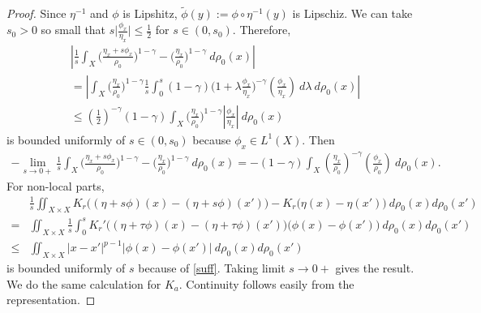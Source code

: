 \documentclass[10pt, letterpaper]{article}
\def\dr{{d\rho_0(x)}}
\theoremstyle{definition}
\theoremstyle{remark}
\begin{document}
\begin{proof}
Since $\eta^{-1}$ and $\phi$ is Lipshitz, $\tilde \phi(y) := \phi\circ \eta^{-1}(y)$ is Lipschiz. We can take $s_0>0$ so small that $s\Big|\frac{\phi_x}{\eta_x}\Big| \le \frac{1}{2}$ for $s\in(0,s_0)$.
Therefore,
\begin{align*}
 &\left|\frac{1}{s}\int_X \Big(\frac{\eta_x + s\phi_x}{\rho_0}\Big)^{1-\gamma} -\Big(\frac{\eta_x}{\rho_0}\Big)^{1-\gamma} \: \dr\right|\\
 &= \left|\int_X \Big(\frac{\eta_x}{\rho_0}\Big)^{1-\gamma} \frac{1}{s}\int_0^s(1-\gamma)\Big(1 + \lambda\frac{\phi_x}{\eta_x}\Big)^{-\gamma}\left(\frac{\phi_x}{\eta_x}\right)\:d\lambda \: \dr\right|\\
 &\le \left(\frac{1}{2}\right)^{-\gamma}(1-\gamma)\int_X \Big(\frac{\eta_x}{\rho_0}\Big)^{1-\gamma} \left|\frac{\phi_x}{\eta_x}\right| \: \dr
\end{align*}
is bounded uniformly of $s\in(0,s_0)$ because $\phi_x \in L^1(X)$. Then
 \begin{align*}
  -\lim_{s \rightarrow 0+} \frac{1}{s} \int_X \Big(\frac{\eta_x + s\phi_x}{\rho_0}\Big)^{1-\gamma} -\Big(\frac{\eta_x}{\rho_0}\Big)^{1-\gamma} \: \dr  = -(1-\gamma)\int_X \left(\frac{\eta_x}{\rho_0}\right)^{-\gamma}\left(\frac{\phi_x}{\rho_0}\right) \: \dr.
 \end{align*}
For non-local parts, 
\begin{align*}
  &\frac{1}{s}\iint_{X\times X} K_r\Big( (\eta + s\phi)(x) - (\eta + s\phi)(x')\Big)- K_r\Big(\eta(x) - \eta(x')\Big) \: d\rho_0(x)d\rho_0(x') \\
  = &\iint_{X\times X}\frac{1}{s}\int_0^s K_r'\Big( (\eta + \tau\phi)(x) - (\eta + \tau\phi)(x')\Big)\Big(\phi(x)-\phi(x')\Big)\: d\rho_0(x)d\rho_0(x')\\
  \le &\iint_{X\times X} |x-x'|^{p-1} |\phi(x)-\phi(x')| \: d\rho_0(x)d\rho_0(x') 
\end{align*}
is bounded uniformly of $s$ because of \eqref{suff}. Taking limit $s \rightarrow 0+$ gives the result. We do the same calculation for $K_a$. Continuity follows easily from the representation. %
\end{proof}
\end{document}
